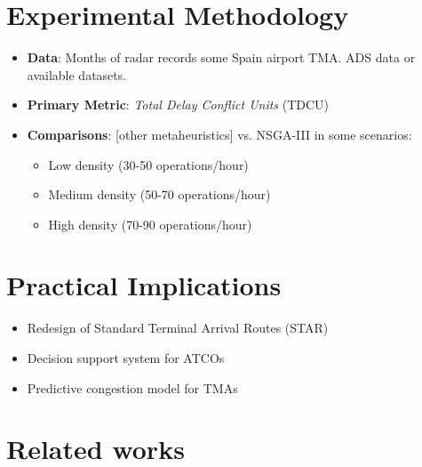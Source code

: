 \begin{minipage}{0.47\textwidth}
    \section{Experimental Methodology}
    \begin{itemize}[itemsep=1mm]\small
        \item \textbf{Data}: Months of radar records some Spain airport TMA. ADS data or available datasets.
        \item \textbf{Primary Metric}: \textit{Total Delay Conflict Units} (TDCU)
        \item \textbf{Comparisons}: [other metaheuristics] vs. NSGA-III  in some scenarios:
              \begin{itemize}
                  \item Low density (30-50 operations/hour)
                  \item Medium density (50-70 operations/hour)
                  \item High density (70-90 operations/hour)
              \end{itemize}
    \end{itemize}
    \section{Practical Implications}
    \begin{itemize}[itemsep=1mm]\small
        \item Redesign of Standard Terminal Arrival Routes (STAR)
        \item Decision support system for ATCOs
        \item Predictive congestion model for TMAs
    \end{itemize}


    \begin{center}
    \end{center}
    \vfill
    \nocite{shirini_comprehensive_2024}
    \nocite{shirini_comprehensive_2024}
    \nocite{barea_integrated_2024}
    \nocite{shirini_multi-objective_2024} \nocite{Guo_2024_CCDF}
    \nocite{mateos_multiobjective_2016} \nocite{2024_Yi_Zhang}
    \vspace{0.3\textheight}
\end{minipage}
\begin{minipage}{0.5\textwidth}
    \section{Related works}
    \printbibliography[heading=none]
\end{minipage}

